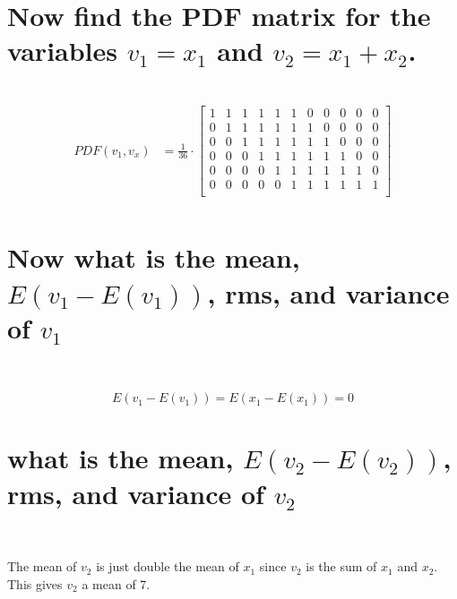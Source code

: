 \documentclass[12pt,letterpaper, onecolumn]{exam}
\begin{document}
\begin{questions}
\begin{parts}
		\part{Now find the PDF matrix for the variables $v_1 = x_1$ and $v_2 = x_1 + x_2$.}\\
		\solution
		\begin{equation}
			\begin{split}
				PDF(v_1,v_x) & = \frac{1}{36}\cdot
				\begin{bmatrix}
					1 & 1 & 1 & 1 & 1 & 1 & 0 & 0 & 0 & 0 & 0 \\
					0 & 1 & 1 & 1 & 1 & 1 & 1 & 0 & 0 & 0 & 0 \\
					0 & 0 & 1 & 1 & 1 & 1 & 1 & 1 & 0 & 0 & 0 \\
					0 & 0 & 0 & 1 & 1 & 1 & 1 & 1 & 1 & 0 & 0 \\
					0 & 0 & 0 & 0 & 1 & 1 & 1 & 1 & 1 & 1 & 0 \\
					0 & 0 & 0 & 0 & 0 & 1 & 1 & 1 & 1 & 1 & 1 \\
				\end{bmatrix}\\
			\end{split}
		\end{equation}
		\part{Now what is the mean, $E(v_1 - E(v_1))$, rms, and variance of $v_1$}\\
		\solution
		\begin{subparts}
			\subpart
			{\begin{equation}
					E(v_1 - E(v_1)) = E(x_1 - E(x_1)) = 0
				\end{equation}}
		\end{subparts}

		\part{what is the mean, $E(v_2 - E(v_2))$, rms, and variance of $v_2$}\\
		\solution

		The mean of $v_2$ is just double the mean of $x_1$ since $v_2$ is the sum of $x_1$ and $x_2$. This gives $v_2$ a mean of 7.


\end{parts}
\end{questions}
\end{document}
